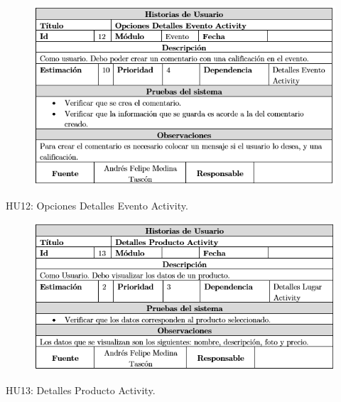 \documentclass[12pt,letterpaper,openany]{book}
\begin{document}
\begin{table}[H]
\begin{center}
\begin{figure}[H]
\begin{center}
\includegraphics[width=13cm]{./imagenes/HU/HU12}
\end{center}
\end{figure}
\end{center}
\caption{HU12: Opciones Detalles Evento Activity.}
\end{table}

\begin{table}[H]
\begin{center}
\begin{figure}[H]
\begin{center}
\includegraphics[width=13cm]{./imagenes/HU/HU13}
\end{center}
\end{figure}
\end{center}
\caption{HU13: Detalles Producto Activity.}
\end{table}
\end{document}
